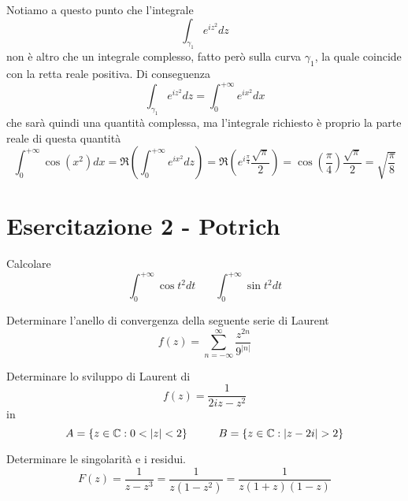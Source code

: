 Notiamo a questo punto che l'integrale
\begin{equation*}
\int\nolimits _{\gamma _{1}} e^{iz^{2}} dz
\end{equation*}
non è altro che un integrale complesso, fatto però sulla curva $\gamma _{1}$, la quale coincide con la retta reale positiva. Di conseguenza
\begin{equation*}
\int\nolimits _{\gamma _{1}} e^{iz^{2}} dz = \int\nolimits ^{ + \infty }_{0} e^{ix^{2}} dx
\end{equation*}
che sarà quindi una quantità complessa, ma l'integrale richiesto è proprio la parte reale di questa quantità
\begin{equation*}
\int\nolimits ^{ + \infty }_{0}\cos\left(x^{2}\right) dx = \Re \left(\int\nolimits ^{ + \infty }_{0} e^{ix^{2}} dz\right) = \Re \left(e^{i\frac{\pi }{4}}\frac{\sqrt{\pi }}{2}\right) = \cos\left(\frac{\pi }{4}\right)\frac{\sqrt{\pi }}{2} = \sqrt{\frac{\pi }{8}}
\end{equation*}
\chapter{Esercitazione 2 - Potrich}
\ParteEsercizi
{}

Calcolare
\begin{equation*}
\int\nolimits ^{ + \infty }_{0}\cos t^{2} dt\ \ \ \ \ \ \ \ \int\nolimits ^{ + \infty }_{0}\sin t^{2} dt
\end{equation*}
\Esercizio{}

Determinare l'anello di convergenza della seguente serie di Laurent
\begin{equation*}
f\left(z\right) = \sum\limits ^{\infty }_{n = -\infty }\frac{z^{2n}}{9^{\left| n\right| }}
\end{equation*}
\Esercizio{}

Determinare lo sviluppo di Laurent di
\begin{equation*}
f\left(z\right) = \frac{1}{2iz - z^{2}}
\end{equation*}
in
\begin{equation*}
A = \left\{z\in \mathbb{C}  :0 < \left| z\right| < 2\right\} \ \ \ \ \ \ \ \ B = \left\{z\in \mathbb{C}  :\left| z - 2i\right|  > 2\right\}
\end{equation*}
\Esercizio{}

Determinare le singolarità e i residui.
\begin{equation*}
F\left(z\right) = \frac{1}{z - z^{3}} = \frac{1}{z\left(1 - z^{2}\right)} = \frac{1}{z\left(1 + z\right)\left(1 - z\right)}
\end{equation*}
\Esercizio{}

